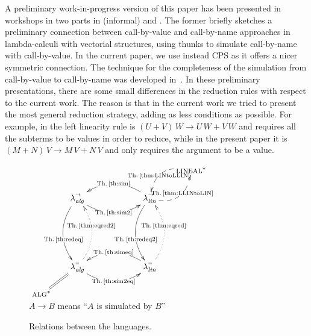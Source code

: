 \documentclass{LMCS}
\newcommand{\olin}{\mbox{\sc lineal}}
\newcommand{\oalg}{\mbox{\sc alg}}
\newcommand{\xllin}[1]{\ensuremath{\lambda^{\raisebox{0.5ex}{\textrm{\tiny $#1$}}}_{{\it lin}}}}
\newcommand{\xlalg}[1]{\ensuremath{\lambda^{\raisebox{0.5ex}{\textrm{\tiny $#1$}}}_{{\it alg}}}}
\newcommand{\llinred}{\xllin{\rightarrow}}
\newcommand{\lalgred}{\xlalg{\rightarrow}}
\newcommand{\llineq}{\xllin{=}}
\newcommand{\lalgeq}{\xlalg{=}}
\begin{document}
\smallskip 
A preliminary work-in-progress version of this paper has been presented in workshops in two parts in \cite{DiazcaroPerdrixTassonValironHOR10} (informal) and \cite{AssafPerdrixDCM11}.
The former briefly sketches a
preliminary connection between call-by-value and call-by-name approaches in
lambda-calculi with vectorial structures, using thunks
to simulate call-by-name with call-by-value. In the current paper, we use
instead CPS as it offers a nicer symmetric
connection. The technique for the completeness of the simulation from
call-by-value to call-by-name was developed in~\cite{AssafPerdrixDCM11}.
In these preliminary presentations, there are some small differences in the reduction rules with respect to the current work. The reason is that in the current work we tried to present the most general reduction strategy, adding as less conditions as possible. For example, in \cite{DiazcaroPerdrixTassonValironHOR10} the left linearity rule is $(U+V)\,W\to U\,W+V\,W$
and requires all the subterms to be values in order to reduce, while in the
present paper it is $(M+N)\,V \to M\,V+N\,V$ and only requires the argument to be a value.



\begin{figure}
  \centering
  $\xymatrix@C=4ex@R=4ex{
    &&&&&
    \olin^*
    \ar@{-->}@/_4ex/[ld]|(0.6){\textrm{Th.\,\ref{thm:LINtoLLIN}}}
    \\
    &
    \lalgred
    \ar@{->}@/_4ex/[ddd]|(0.6){\textrm{Th.\,\ref{th:redeq}}}
    \ar@{->}@/_4ex/[rrr]|{\textrm{Th.\,\ref{th:sim2}}}
    &
    &
    & 
    \llinred
    \ar@{-->}@/_4ex/[ru]|(0.6){\textrm{Th.\,\ref{thm:LLINtoLIN}}}
    \ar@{->}@/_4ex/[lll]|{\textrm{Th.\,\ref{th:sim}}}
    \ar@{->}@/_4ex/[ddd]|(0.6){\textrm{Th.\,\ref{th:redeq2}}} 
    &
    \\&&&&
    \\&&&&\\
    &
    \lalgeq 
    \ar@{->}@/_4ex/[rrr]|{\textrm{Th.\,\ref{th:sim2eq}}}
    \ar@{.>}@/_4ex/[uuu]|(0.6){\textrm{Th.\,\ref{thm:eqred2}}}
    &
    &
    &
    \llineq
    \ar@{->}@/_4ex/[lll]|{\textrm{Th.\,\ref{th:simeq}}}
    \ar@{.>}@/_4ex/[uuu]|(0.6){\textrm{Th.\,\ref{thm:eqred}}}
    &
    \\
    \oalg^*\ar@{=}[ru]
    &&&&&
  }$\\[1.5ex]
  \small
  $A\to B$ means ``$A$ is simulated by $B$''
  \caption{Relations between the languages. }
  \label{fig:relation}
\end{figure}
\end{document}
